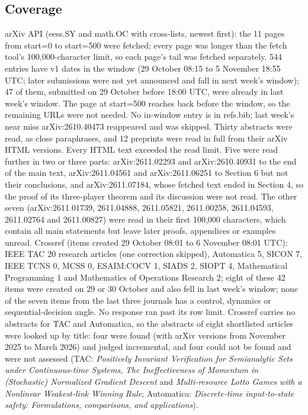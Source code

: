 \documentclass[11pt,a4paper]{article}
\begin{document}
\subsection*{Coverage}
arXiv API (eess.SY and math.OC with cross-lists, newest first): the 11 pages from start=0 to start=500 were fetched; every page was longer than the fetch tool's 100{,}000-character limit, so each page's tail was fetched separately. 544 entries have v1 dates in the window (29 October 08:15 to 5 November 18:55 UTC; later submissions were not yet announced and fall in next week's window); 47 of them, submitted on 29 October before 18:00 UTC, were already in last week's window. The page at start=500 reaches back before the window, so the remaining URLs were not needed. No in-window entry is in refs.bib; last week's near miss arXiv:2610.40473 reappeared and was skipped. Thirty abstracts were read, as close paraphrases, and 12 preprints were read in full from their arXiv HTML versions. Every HTML text exceeded the read limit. Five were read further in two or three parts: arXiv:2611.02293 and arXiv:2610.40931 to the end of the main text, arXiv:2611.04561 and arXiv:2611.06251 to Section 6 but not their conclusions, and arXiv:2611.07184, whose fetched text ended in Section 4, so the proof of its three-player theorem and its discussion were not read. The other seven (arXiv:2611.01739, 2611.04888, 2611.05821, 2611.00258, 2611.04593, 2611.02764 and 2611.00827) were read in their first 100{,}000 characters, which contain all main statements but leave later proofs, appendices or examples unread. Crossref (items created 29 October 08:01 to 6 November 08:01 UTC): IEEE TAC 20 research articles (one correction skipped), Automatica 5, SICON 7, IEEE TCNS 0, MCSS 0, ESAIM:COCV 1, SIADS 2, SIOPT 4, Mathematical Programming 1 and Mathematics of Operations Research 2; eight of these 42 items were created on 29 or 30 October and also fell in last week's window; none of the seven items from the last three journals has a control, dynamics or sequential-decision angle. No response ran past its row limit. Crossref carries no abstracts for TAC and Automatica, so the abstracts of eight shortlisted articles were looked up by title: four were found (with arXiv versions from November 2025 to March 2026) and judged incremental, and four could not be found and were not assessed (TAC: \emph{Positively Invariant Verification for Semianalytic Sets under Continuous-time Systems}, \emph{The Ineffectiveness of Momentum in (Stochastic) Normalized Gradient Descent} and \emph{Multi-resource Lotto Games with a Nonlinear Weakest-link Winning Rule}; Automatica: \emph{Discrete-time input-to-state safety: Formulations, comparisons, and applications}).
\end{document}
